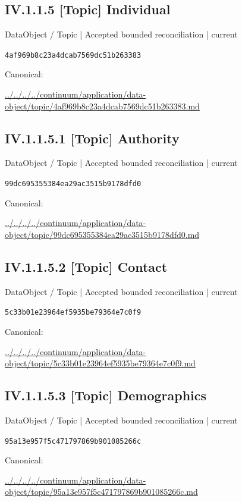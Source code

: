 \documentclass[10pt,a4paper]{article}
\begin{document}
\subsection*{IV.1.1.5 [Topic] Individual}
\label{element-4af969b8c23a4dcab7569dc51b263383}
{\small DataObject / Topic | Accepted bounded reconciliation | current}\par
\texttt{4af969b8c23a4dcab7569dc51b263383}\par
Canonical: \par
{\footnotesize\url{../../../../continuum/application/data-object/topic/4af969b8c23a4dcab7569dc51b263383.md}}\par
\subsection*{IV.1.1.5.1 [Topic] Authority}
\label{element-99dc695355384ea29ac3515b9178dfd0}
{\small DataObject / Topic | Accepted bounded reconciliation | current}\par
\texttt{99dc695355384ea29ac3515b9178dfd0}\par
Canonical: \par
{\footnotesize\url{../../../../continuum/application/data-object/topic/99dc695355384ea29ac3515b9178dfd0.md}}\par
\subsection*{IV.1.1.5.2 [Topic] Contact}
\label{element-5c33b01e23964ef5935be79364e7c0f9}
{\small DataObject / Topic | Accepted bounded reconciliation | current}\par
\texttt{5c33b01e23964ef5935be79364e7c0f9}\par
Canonical: \par
{\footnotesize\url{../../../../continuum/application/data-object/topic/5c33b01e23964ef5935be79364e7c0f9.md}}\par
\subsection*{IV.1.1.5.3 [Topic] Demographics}
\label{element-95a13e957f5c471797869b901085266c}
{\small DataObject / Topic | Accepted bounded reconciliation | current}\par
\texttt{95a13e957f5c471797869b901085266c}\par
Canonical: \par
{\footnotesize\url{../../../../continuum/application/data-object/topic/95a13e957f5c471797869b901085266c.md}}\par
\end{document}
